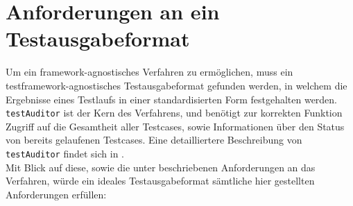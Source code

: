\section{Anforderungen an ein Testausgabeformat}\label{Anforderungen Testausgabeformat}
Um ein framework-agnostisches Verfahren zu ermöglichen, muss ein testframework-agnostisches Testausgabeformat gefunden werden, in welchem die Ergebnisse eines Testlaufs in einer standardisierten Form festgehalten werden.\\
\texttt{testAuditor} ist der Kern des Verfahrens, und benötigt zur korrekten Funktion Zugriff auf die Gesamtheit aller Testcases, sowie Informationen über den Status von bereits gelaufenen Testcases. Eine detailliertere Beschreibung von \texttt{testAuditor} findet sich in .\\
Mit Blick auf diese, sowie die unter  beschriebenen Anforderungen an das Verfahren, würde ein ideales Testausgabeformat sämtliche hier gestellten Anforderungen erfüllen:

